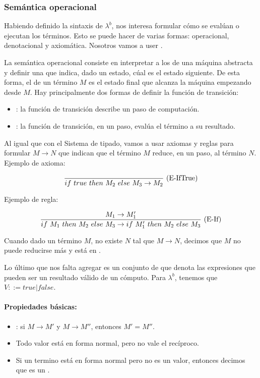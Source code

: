 \subsubsection{Semántica operacional}

Habiendo definido la sintaxis de $\lambda^b$, nos interesa formular cómo se evalúan o ejecutan los términos. Esto se puede hacer de varias formas: operacional, denotacional y axiomática. Nosotros vamos a user .

La semántica operacional consiste en interpretar a los  de una máquina abstracta y definir una  que indica, dado un estado, cúal es el estado siguiente. De esta forma, el  de un término $M$ es el estado final que alcanza la máquina empezando desde $M$. Hay principalmente dos formas de definir la función de transición:

\begin{itemize}
  \item {}: la función de transición describe un paso de computación.
  \item {}: la función de transición, en un paso, evalúa el término a su resultado.
\end{itemize}

Al igual que con el Sistema de tipado, vamos a usar axiomas y reglas para formular  $M\to N$ que indican que el término $M$ reduce, en un paso, al término $N$. Ejemplo de axioma:

\[\frac{}{if\ true\ then\ M_2\ else\ M_3 \to M_2}\ \text{(E-IfTrue)}\]

Ejemplo de regla:

\[\frac{M_1 \to M_1'}{if\ M_1\ then\ M_2\ else\ M_3 \to if\ M_1'\ then\ M_2\ else\ M_3}\ \text{(E-If)}\]

Cuando dado un término $M$, no existe $N$ tal que $M\to N$, decimos que $M$ no puede reducirse más y está en .

Lo último que nos falta agregar es un conjunto de  que denota las expresiones que pueden ser un resultado válido de un cómputo. Para $\lambda^b$, tenemos que $V ::= true \vert false$.

\paragraph{Propiedades básicas:}

\begin{itemize}
  \item {}: si $M \to M'$ y $M \to M''$, entonces $M'= M''$.
  \item Todo valor está en forma normal, pero no vale el recíproco.
  \item Si un termino está en forma normal pero no es un valor, entonces decimos que es un .
\end{itemize}

